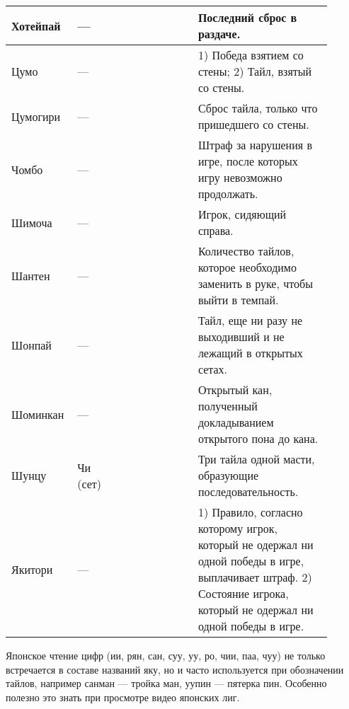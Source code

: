 \begin{tabularx}{\linewidth}{|L{0.14\linewidth}|L{0.13\linewidth}|L{0.1\linewidth}|L{0.13\linewidth}|L{0.4\linewidth}|}
	\hline
	Хотейпай & --- &  &  & Последний сброс в раздаче. \\
	\hline
	Цумо & --- &  &  & 1) Победа взятием со стены; 2) Тайл, взятый со стены. \\
	\hline
	Цумогири & --- &  &  & Сброс тайла, только что пришедшего со стены. \\
	\hline
	Чомбо & --- &  &  & Штраф за нарушения в игре, после которых игру невозможно продолжать. \\
	\hline
	Шимоча & --- &  &  & Игрок, сидяющий справа. \\
	\hline
	Шантен & --- &  &  & Количество тайлов, которое необходимо заменить в руке, чтобы выйти в темпай. \\
	\hline
	Шонпай & --- &  &  & Тайл, еще ни разу не выходивший и не лежащий в открытых сетах. \\
	\hline
	Шоминкан & --- &  &   & Открытый кан, полученный докладыванием открытого пона до кана. \\
	\hline
	Шунцу & Чи (сет) &  &  & Три тайла одной масти, образующие последовательность. \\
	\hline
	Якитори & --- &  &  & 1) Правило, согласно которому игрок, который не одержал ни одной победы в игре, выплачивает штраф. 2) Состояние игрока, который не одержал ни одной победы в игре. \\
	\hline
\end{tabularx}

Японское чтение цифр (ии, рян, сан, суу, уу, ро, чии, паа, чуу) не только встречается в составе названий яку, но и часто используется при обозначении тайлов, например санман --- тройка ман, уупин --- пятерка пин. Особенно полезно это знать при просмотре видео японских лиг.

